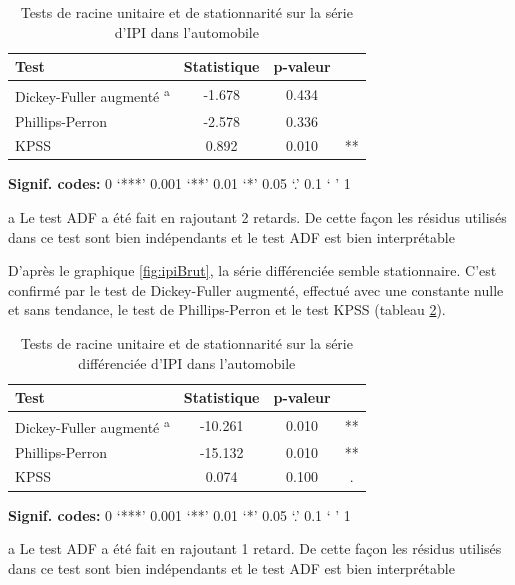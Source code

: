 \documentclass[]{article}
\begin{document}
\begin{table}[!h]

\caption{\label{tab:tabTestsInit}Tests de racine unitaire et de stationnarité sur la série d'IPI dans l'automobile}
\centering
\begin{threeparttable}
\begin{tabular}[t]{lccc}
\toprule
Test & Statistique & p-valeur & \\
\midrule
Dickey-Fuller augmenté \textsuperscript{a} & -1.678 & 0.434 & \\
Phillips-Perron & -2.578 & 0.336 & \\
KPSS & 0.892 & 0.010 & **\\
\bottomrule
\end{tabular}
\begin{tablenotes}
\item \hspace{-0.4cm}\textbf{Signif. codes: }0 `***' 0.001 `**' 0.01 `*' 0.05 `.' 0.1 ` ' 1
\item[a] Le test ADF a été fait en rajoutant 2 retards. De cette façon les résidus utilisés dans ce test sont bien indépendants et le test ADF est bien interprétable
\end{tablenotes}
\end{threeparttable}
\end{table}

D'après le graphique \ref{fig:ipiBrut}, la série différenciée semble stationnaire.
C'est confirmé par le test de Dickey-Fuller augmenté, effectué avec une constante nulle et sans tendance, le test de Phillips-Perron et le test KPSS (tableau \ref{tab:tabTestsDiff}).

\begin{table}[!h]

\caption{\label{tab:tabTestsDiff}Tests de racine unitaire et de stationnarité sur la série différenciée d'IPI dans l'automobile}
\centering
\begin{threeparttable}
\begin{tabular}[t]{lccc}
\toprule
Test & Statistique & p-valeur & \\
\midrule
Dickey-Fuller augmenté \textsuperscript{a} & -10.261 & 0.010 & **\\
Phillips-Perron & -15.132 & 0.010 & **\\
KPSS & 0.074 & 0.100 & .\\
\bottomrule
\end{tabular}
\begin{tablenotes}
\item \hspace{-0.4cm}\textbf{Signif. codes: }0 `***' 0.001 `**' 0.01 `*' 0.05 `.' 0.1 ` ' 1
\item[a] Le test ADF a été fait en rajoutant 1 retard. De cette façon les résidus utilisés dans ce test sont bien indépendants et le test ADF est bien interprétable
\end{tablenotes}
\end{threeparttable}
\end{table}
\end{document}
